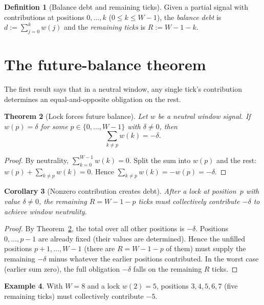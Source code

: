 \documentclass[11pt]{amsart}
\newtheorem{theorem}{Theorem}[section]
\newtheorem{corollary}[theorem]{Corollary}
\theoremstyle{definition}
\newtheorem{definition}[theorem]{Definition}
\newtheorem{example}[theorem]{Example}
\theoremstyle{remark}
\begin{document}
\begin{definition}[Balance debt and remaining ticks]\label{def:debt}
Given a partial signal with contributions at positions $0,\ldots,k$
($0\le k\le W{-}1$), the \emph{balance debt} is $d:=\sum_{j=0}^k w(j)$
and the \emph{remaining ticks} is $R:=W{-}1{-}k$.
\end{definition}

\section{The future-balance theorem}\label{sec:future}

The first result says that in a neutral window, any single tick's
contribution determines an equal-and-opposite obligation on the rest.

\begin{theorem}[Lock forces future balance]\label{thm:lock}
Let $w$ be a neutral window signal.
If $w(p)=\delta$ for some $p\in\{0,\ldots,W{-}1\}$ with $\delta\ne 0$,
then
\[
\sum_{k\ne p} w(k)=-\delta.
\]
\end{theorem}
\begin{proof}
By neutrality, $\sum_{k=0}^{W-1} w(k)=0$.
Split the sum into $w(p)$ and the rest:
$w(p)+\sum_{k\ne p}w(k)=0$.
Hence $\sum_{k\ne p}w(k)=-w(p)=-\delta$.
\end{proof}

\begin{corollary}[Nonzero contribution creates debt]\label{cor:debt}
After a lock at position~$p$ with value $\delta\neq 0$, the remaining
$R=W{-}1{-}p$ ticks must collectively contribute $-\delta$ to achieve
window neutrality.
\end{corollary}
\begin{proof}
By Theorem~\ref{thm:lock}, the total over all other positions is $-\delta$.
Positions $0,\ldots,p{-}1$ are already fixed (their values are determined).
Hence the unfilled positions $p{+}1,\ldots,W{-}1$ (there are
$R=W{-}1{-}p$ of them) must supply the remaining $-\delta$ minus
whatever the earlier positions contributed.
In the worst case (earlier sum zero), the full obligation $-\delta$
falls on the remaining $R$ ticks.
\end{proof}

\begin{example}
With $W=8$ and a lock $w(2)=5$, positions $3,4,5,6,7$ (five remaining
ticks) must collectively contribute $-5$.
\end{example}
\end{document}

